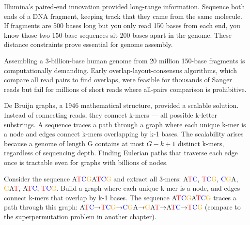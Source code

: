 Illumina's paired-end innovation provided long-range information. Sequence both ends of a DNA fragment, keeping track that they came from the same molecule. If fragments are 500 bases long but you only read 150 bases from each end, you know those two 150-base sequences sit 200 bases apart in the genome. These distance constraints prove essential for genome assembly.

Assembling a 3-billion-base human genome from 20 million 150-base fragments is computationally demanding. Early overlap-layout-consensus algorithms, which compare all read pairs to find overlaps, were feasible for thousands of Sanger reads but fail for millions of short reads where all-pairs comparison is prohibitive.

De Bruijn graphs, a 1946 mathematical structure, provided a scalable solution. Instead of connecting reads, they connect k-mers — all possible k-letter substrings. A sequence traces a path through a graph where each unique k-mer is a node and edges connect k-mers overlapping by k-1 bases. The scalability arises because a genome of length G contains at most $G-k+1$ distinct k-mers, regardless of sequencing depth. Finding Eulerian paths that traverse each edge once is tractable even for graphs with billions of nodes.

Consider the sequence \textcolor{green!60!black}{A}\textcolor{red}{T}\textcolor{blue}{C}\textcolor{orange}{G}\textcolor{green!60!black}{A}\textcolor{red}{T}\textcolor{blue}{C}\textcolor{orange}{G} and extract all 3-mers: \textcolor{green!60!black}{A}\textcolor{red}{T}\textcolor{blue}{C}, \textcolor{red}{T}\textcolor{blue}{C}\textcolor{orange}{G}, \textcolor{blue}{C}\textcolor{orange}{G}\textcolor{green!60!black}{A}, \textcolor{orange}{G}\textcolor{green!60!black}{A}\textcolor{red}{T}, \textcolor{green!60!black}{A}\textcolor{red}{T}\textcolor{blue}{C}, \textcolor{red}{T}\textcolor{blue}{C}\textcolor{orange}{G}. Build a graph where each unique k-mer is a node, and edges connect k-mers that overlap by k-1 bases. The sequence \textcolor{green!60!black}{A}\textcolor{red}{T}\textcolor{blue}{C}\textcolor{orange}{G}\textcolor{green!60!black}{A}\textcolor{red}{T}\textcolor{blue}{C}\textcolor{orange}{G} traces a path through this graph: \textcolor{green!60!black}{A}\textcolor{red}{T}\textcolor{blue}{C}→\textcolor{red}{T}\textcolor{blue}{C}\textcolor{orange}{G}→\textcolor{blue}{C}\textcolor{orange}{G}\textcolor{green!60!black}{A}→\textcolor{orange}{G}\textcolor{green!60!black}{A}\textcolor{red}{T}→\textcolor{green!60!black}{A}\textcolor{red}{T}\textcolor{blue}{C}→\textcolor{red}{T}\textcolor{blue}{C}\textcolor{orange}{G} (compare to the superpermutation problem in another chapter).

